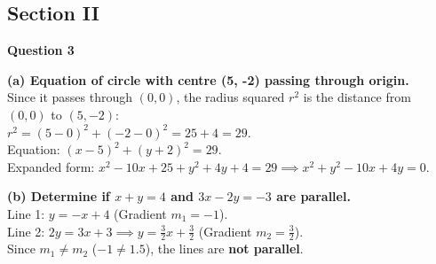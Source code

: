 \documentclass[12pt]{article}
\begin{document}
\subsection*{Section II}

\textbf{Question 3}

\textbf{(a) Equation of circle with centre (5, -2) passing through origin.} \\
Since it passes through $(0,0)$, the radius squared $r^2$ is the distance from $(0,0)$ to $(5, -2)$: \\
$r^2 = (5 - 0)^2 + (-2 - 0)^2 = 25 + 4 = 29$. \\
Equation: $(x - 5)^2 + (y + 2)^2 = 29$. \\
Expanded form: $x^2 - 10x + 25 + y^2 + 4y + 4 = 29 \implies x^2 + y^2 - 10x + 4y = 0$.

\textbf{(b) Determine if $x+y=4$ and $3x-2y=-3$ are parallel.} \\
Line 1: $y = -x + 4$ (Gradient $m_1 = -1$). \\
Line 2: $2y = 3x + 3 \implies y = \frac{3}{2}x + \frac{3}{2}$ (Gradient $m_2 = \frac{3}{2}$). \\
Since $m_1 \neq m_2$ ($-1 \neq 1.5$), the lines are \textbf{not parallel}.
\end{document}
